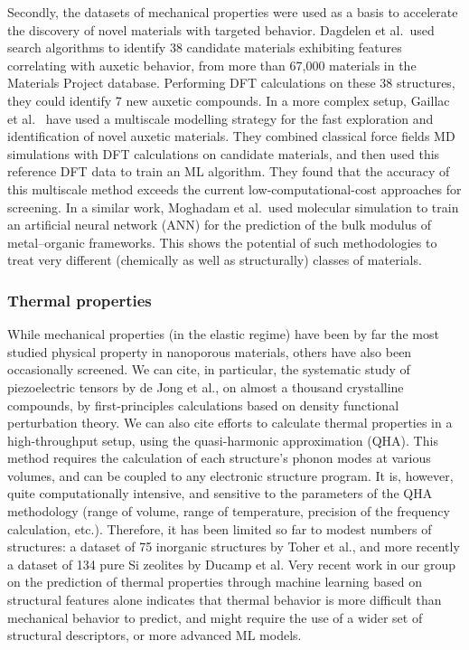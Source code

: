 \documentclass[main.tex]{subfiles}
\begin{document}
Secondly, the datasets of mechanical properties were used as a basis to accelerate the discovery of novel materials with targeted behavior. Dagdelen et al.\ used search algorithms to identify 38 candidate materials exhibiting features correlating with auxetic behavior, from more than 67,000 materials in the Materials Project database.\cite{Dagdelen_2017} Performing DFT calculations on these 38 structures, they could identify 7 new auxetic compounds. In a more complex setup, Gaillac et al.~\cite{Gaillac_2020} have used a multiscale modelling strategy for the fast exploration and identification of novel auxetic materials. They combined classical force fields MD simulations with DFT calculations on candidate materials, and then used this reference DFT data to train an ML algorithm. They found that the accuracy of this multiscale method exceeds the current low-computational-cost approaches for screening. In a similar work, Moghadam et al.\ used molecular simulation to train an artificial neural network (ANN) for the prediction of the bulk modulus of metal--organic frameworks.\cite{Moghadam_2019} This shows the potential of such methodologies to treat very different (chemically as well as structurally) classes of materials.

\subsubsection{Thermal properties}

While mechanical properties (in the elastic regime) have been by far the most studied physical property in nanoporous materials, others have also been occasionally screened. We can cite, in particular, the systematic study of piezoelectric tensors by de Jong et al., on almost a thousand crystalline compounds, by first-principles calculations based on density functional perturbation theory.\cite{deJong2015_piezo} We can also cite efforts to calculate thermal properties in a high-throughput setup, using the quasi-harmonic approximation (QHA).\cite{Togo_2010} This method requires the calculation of each structure's phonon modes at various volumes, and can be coupled to any electronic structure program.\cite{Togo_2015} It is, however, quite computationally intensive, and sensitive to the parameters of the QHA methodology (range of volume, range of temperature, precision of the frequency calculation, etc.). Therefore, it has been limited so far to modest numbers of structures: a dataset of 75 inorganic structures by Toher et al.,\cite{Toher_2014} and more recently a dataset of 134 pure Si zeolites by Ducamp et al.\cite{Ducamp_2021} Very recent work in our group on the prediction of thermal properties through machine learning based on structural features alone indicates that thermal behavior is more difficult than mechanical behavior to predict, and might require the use of a wider set of structural descriptors, or more advanced ML models.\cite{Ducamp_2022}
\end{document}
